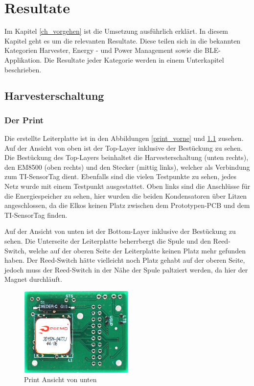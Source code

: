 \chapter{Resultate}
\label{ch_resultat}

Im Kapitel \ref{ch_vorgehen} ist die Umsetzung ausführlich erklärt. In diesem Kapitel geht es um die relevanten Resultate. Diese teilen sich in die bekannten Kategorien Harvester, Energy - und Power Management sowie die BLE-Applikation. Die Resultate jeder Kategorie werden in einem Unterkapitel beschrieben.
 
\section{Harvesterschaltung}

\subsection{Der Print}

Die erstellte Leiterplatte ist in den Abbildungen \ref{print_vorne} und \ref{print_rueckseite} zusehen. Auf der Ansicht von oben ist der Top-Layer inklusive der Bestückung zu sehen. Die Bestückung des Top-Layers beinhaltet die Harvesterschaltung (unten rechts), den EM8500 (oben rechts) und den Stecker (mittig links), welcher als Verbindung zum TI-SensorTag dient. Ebenfalls sind die vielen Testpunkte zu sehen, jedes Netz wurde mit einem Testpunkt ausgestattet. Oben links sind die Anschlüsse für die Energiespeicher zu sehen, hier wurden die beiden Kondensatoren über Litzen angeschlossen, da die Elkos keinen Platz zwischen dem Prototypen-PCB und dem TI-SensorTag finden. 

Auf der Ansicht von unten ist der Bottom-Layer inklusive der Bestückung zu sehen. Die Unterseite der Leiterplatte beherrbergt die Spule und den Reed-Switch, welche auf der oberen Seite der Leiterplatte keinen Platz mehr gefunden haben. Der Reed-Switch hätte vielleicht noch Platz gehabt auf der oberen Seite, jedoch muss der Reed-Switch in der Nähe der Spule paltziert werden, da hier der Magnet durchläuft.

\begin{figure}[ht]
    \includegraphics[width=0.5\textwidth]{4Resultate/imag/print_rueckseite.png} 
    \caption{Print Ansicht von unten}
    \label{print_rueckseite}
\end{figure}


